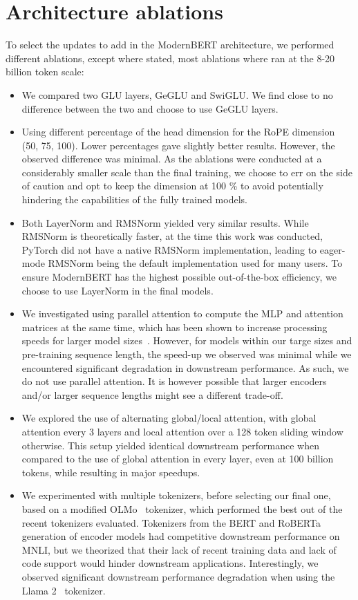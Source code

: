 \documentclass[11pt]{article}
\begin{document}
\section{Architecture ablations}
\label{sec:archablations}
To select the updates to add in the ModernBERT architecture, we performed different ablations, except where stated, most ablations where ran at the 8-20 billion token scale:
\begin{itemize}
    \item We compared two GLU layers, GeGLU and SwiGLU. We find close to no difference between the two and choose to use GeGLU layers.
    \item Using different percentage of the head dimension for the RoPE dimension (50, 75, 100). Lower percentages gave slightly better results. However, the observed difference was minimal. As the ablations were conducted at a considerably smaller scale than the final training, we choose to err on the side of caution and opt to keep the dimension at 100 \%  to avoid potentially hindering the capabilities of the fully trained models.
    \item Both LayerNorm and RMSNorm yielded very similar results. While RMSNorm is theoretically faster, at the time this work was conducted, PyTorch did not have a native RMSNorm implementation, leading to eager-mode RMSNorm being the default implementation used for many users. To ensure ModernBERT has the highest possible out-of-the-box efficiency, we choose to use LayerNorm in the final models.
    \item We investigated using parallel attention to compute the MLP and attention matrices at the same time, which has been shown to increase processing speeds for larger model sizes~\cite{palm}. However, for models within our targe sizes and pre-training sequence length, the speed-up we observed was minimal while we encountered significant degradation in downstream performance. As such, we do not use parallel attention. It is however possible that larger encoders and/or larger sequence lengths might see a different trade-off.
    \item We explored the use of alternating global/local attention, with global attention every 3 layers and local attention over a 128 token sliding window otherwise. This setup yielded identical downstream performance when compared to the use of global attention in every layer, even at 100 billion tokens, while resulting in major speedups.
    \item We experimented with multiple tokenizers, before selecting our final one, based on a modified OLMo~\cite{olmo} tokenizer, which performed the best out of the recent tokenizers evaluated. Tokenizers from the BERT and RoBERTa generation of encoder models had competitive downstream performance on MNLI, but we theorized that their lack of recent training data and lack of code support would hinder downstream applications. Interestingly, we observed significant downstream performance degradation when using the Llama 2~\cite{llama2} tokenizer.

\end{itemize}
\end{document}
